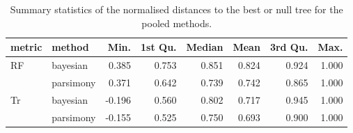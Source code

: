 \begin{table}[ht]
\centering
\begin{tabular}{llrrrrrr}
  \hline
metric & method & Min. & 1st Qu. & Median & Mean & 3rd Qu. & Max. \\ 
  \hline
RF & bayesian & 0.385 & 0.753 & 0.851 & 0.824 & 0.924 & 1.000 \\ 
   & parsimony & 0.371 & 0.642 & 0.739 & 0.742 & 0.865 & 1.000 \\ 
  Tr & bayesian & -0.196 & 0.560 & 0.802 & 0.717 & 0.945 & 1.000 \\ 
   & parsimony & -0.155 & 0.525 & 0.750 & 0.693 & 0.900 & 1.000 \\ 
   \hline
\end{tabular}
\caption{Summary statistics of the normalised distances to the best or null tree for the pooled methods.} 
\label{Tab_pooledmethod}
\end{table}
